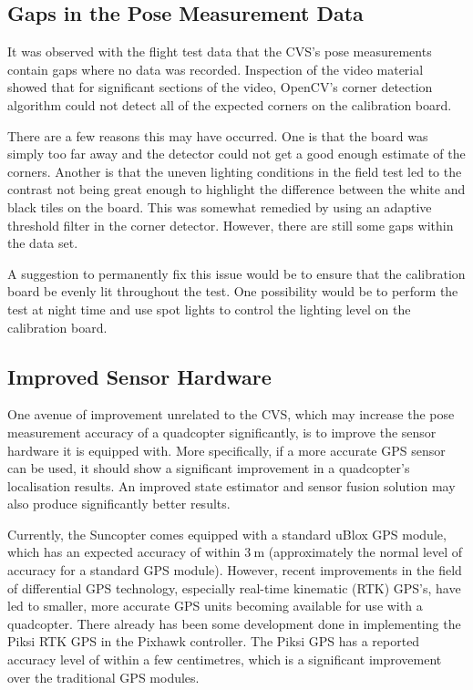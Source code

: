 \subsection{Gaps in the Pose Measurement Data}

It was observed with the flight test data that the CVS's pose measurements contain gaps where no data was recorded. Inspection of the video material showed that for significant sections of the video, OpenCV's corner detection algorithm could not detect all of the expected corners on the calibration board. 

There are a few reasons this may have occurred. One is that the board was simply too far away and the detector could not get a good enough estimate of the corners. Another is that the uneven lighting conditions in the field test led to the contrast not being great enough to highlight the difference between the white and black tiles on the board. This was somewhat remedied by using an adaptive threshold filter in the corner detector. However, there are still some gaps within the data set. 

A suggestion to permanently fix this issue would be to ensure that the calibration board be evenly lit throughout the test. One possibility would be to perform the test at night time and use spot lights to control the lighting level on the calibration board. 

\subsection{Improved Sensor Hardware}

One avenue of improvement unrelated to the CVS, which may increase the pose measurement accuracy of a quadcopter significantly, is to improve the sensor hardware it is equipped with. More specifically, if a more accurate GPS sensor can be used, it should show a significant improvement in a quadcopter's localisation results. An improved state estimator and sensor fusion solution may also produce significantly better results. 

Currently, the Suncopter comes equipped with a standard uBlox GPS module, which has an expected accuracy of within $\SI{3}{\m}$ (approximately the normal level of accuracy for a standard GPS module). However, recent improvements in the field of differential GPS technology, especially real-time kinematic (RTK) GPS's, have led to smaller, more accurate GPS units becoming available for use with a quadcopter. There already has been some development done in implementing the Piksi RTK GPS in the Pixhawk controller. The Piksi GPS has a reported accuracy level of within a few centimetres, which is a significant improvement over the traditional GPS modules. 

